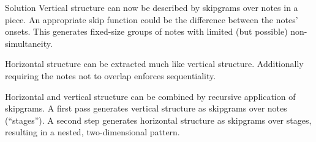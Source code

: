 \documentclass[final]{beamer}
\newcommand*{\pianoroll}{
  \draw (0,2) rectangle (1,2.4);
  \draw (1,2.4) rectangle (2,2.8);
  \draw (2,2) rectangle (2.5,2.4);
  \draw (2.5,1.6) rectangle (3,2);
  \draw (3,1.2) rectangle (3.5,1.6);
  \draw (3.5,0.8) rectangle (4,1.2);
  
  \draw (4,1.6) rectangle (5,2);
  \draw (5,2) rectangle (6,2.4);
  \draw (6,1.6) rectangle (6.5,2);
  \draw (6.5,1.2) rectangle (7,1.6);
  \draw (7,0.8) rectangle (7.5,1.2);
  \draw (7.5,0.4) rectangle (8,0.8);
  
  \draw (1,-0.4) rectangle (2,0);
  \draw (2,0) rectangle (4,0.4);
  \draw (5,-0.8) rectangle (6,-0.4);
  \draw (6,-0.4) rectangle (8,0);
}
\begin{document}
\begin{frame}[t]
\begin{columns}[t]
\begin{column}{0.3\textwidth}
\begin{block}{Solution}
        Vertical structure can now be described by \alert{skipgrams over notes} in a piece.
        An appropriate skip function could be the difference between the notes' onsets.
        This generates fixed-size groups of notes with \alert{limited} (but possible)
        \alert{non-simultaneity}.

        \begin{adjustbox}{scale=2.7,center,margin=0 1ex}
        \end{adjustbox}
        
        Horizontal structure can be extracted much like vertical structure.
        Additionally requiring the notes not to overlap enforces \alert{sequentiality}.

        \begin{adjustbox}{scale=2.7,center,margin=0 1ex}
        \end{adjustbox}
        
        Horizontal and vertical structure can be combined
        by \alert{recursive application of skipgrams}.
        A first pass generates vertical structure as skipgrams over notes (\enquote{stages}).
        A second step generates horizontal structure as skipgrams over stages,
        resulting in a nested, two-dimensional pattern.

        \begin{adjustbox}{scale=2.7,center,margin=0 1ex}
        \end{adjustbox}
      \end{block}
    \end{column}
    

\end{columns}
\end{frame}
\end{document}
